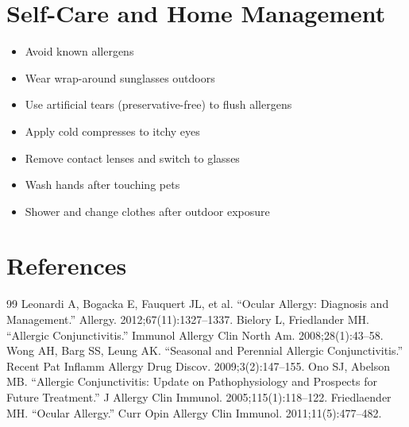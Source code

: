 \section*{Self-Care and Home Management}
\begin{itemize}
\item Avoid known allergens
\item Wear wrap-around sunglasses outdoors
\item Use artificial tears (preservative-free) to flush allergens
\item Apply cold compresses to itchy eyes
\item Remove contact lenses and switch to glasses
\item Wash hands after touching pets
\item Shower and change clothes after outdoor exposure
\end{itemize}

\section*{References}
\begin{thebibliography}{99}
 Leonardi A, Bogacka E, Fauquert JL, et al. ``Ocular Allergy: Diagnosis and Management.'' Allergy. 2012;67(11):1327--1337.
 Bielory L, Friedlander MH. ``Allergic Conjunctivitis.'' Immunol Allergy Clin North Am. 2008;28(1):43--58.
 Wong AH, Barg SS, Leung AK. ``Seasonal and Perennial Allergic Conjunctivitis.'' Recent Pat Inflamm Allergy Drug Discov. 2009;3(2):147--155.
 Ono SJ, Abelson MB. ``Allergic Conjunctivitis: Update on Pathophysiology and Prospects for Future Treatment.'' J Allergy Clin Immunol. 2005;115(1):118--122.
 Friedlaender MH. ``Ocular Allergy.'' Curr Opin Allergy Clin Immunol. 2011;11(5):477--482.
\end{thebibliography}
